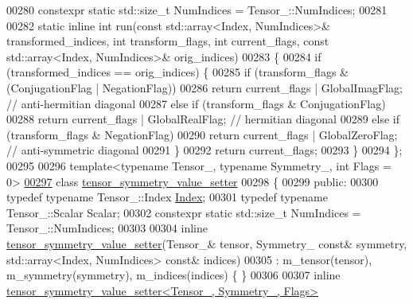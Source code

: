 \begin{DoxyCode}
00280   constexpr \textcolor{keyword}{static} std::size\_t NumIndices = Tensor\_::NumIndices;
00281 
00282   \textcolor{keyword}{static} \textcolor{keyword}{inline} \textcolor{keywordtype}{int} run(\textcolor{keyword}{const} std::array<Index, NumIndices>& transformed\_indices, \textcolor{keywordtype}{int} transform\_flags, \textcolor{keywordtype}{int} 
      current\_flags, \textcolor{keyword}{const} std::array<Index, NumIndices>& orig\_indices)
00283   \{
00284     \textcolor{keywordflow}{if} (transformed\_indices == orig\_indices) \{
00285       \textcolor{keywordflow}{if} (transform\_flags & (ConjugationFlag | NegationFlag))
00286         \textcolor{keywordflow}{return} current\_flags | GlobalImagFlag; \textcolor{comment}{// anti-hermitian diagonal}
00287       \textcolor{keywordflow}{else} \textcolor{keywordflow}{if} (transform\_flags & ConjugationFlag)
00288         \textcolor{keywordflow}{return} current\_flags | GlobalRealFlag; \textcolor{comment}{// hermitian diagonal}
00289       \textcolor{keywordflow}{else} \textcolor{keywordflow}{if} (transform\_flags & NegationFlag)
00290         \textcolor{keywordflow}{return} current\_flags | GlobalZeroFlag; \textcolor{comment}{// anti-symmetric diagonal}
00291     \}
00292     \textcolor{keywordflow}{return} current\_flags;
00293   \}
00294 \};
00295 
00296 \textcolor{keyword}{template}<\textcolor{keyword}{typename} Tensor\_, \textcolor{keyword}{typename} Symmetry\_, \textcolor{keywordtype}{int} Flags = 0>
\hyperlink{class_eigen_1_1internal_1_1tensor__symmetry__value__setter}{00297} \textcolor{keyword}{class }\hyperlink{class_eigen_1_1internal_1_1tensor__symmetry__value__setter}{tensor\_symmetry\_value\_setter}
00298 \{
00299   \textcolor{keyword}{public}:
00300     \textcolor{keyword}{typedef} \textcolor{keyword}{typename} Tensor\_::Index \hyperlink{namespace_eigen_a62e77e0933482dafde8fe197d9a2cfde}{Index};
00301     \textcolor{keyword}{typedef} \textcolor{keyword}{typename} Tensor\_::Scalar Scalar;
00302     constexpr \textcolor{keyword}{static} std::size\_t NumIndices = Tensor\_::NumIndices;
00303 
00304     \textcolor{keyword}{inline} \hyperlink{class_eigen_1_1internal_1_1tensor__symmetry__value__setter}{tensor\_symmetry\_value\_setter}(Tensor\_& tensor, Symmetry\_ \textcolor{keyword}{const}& 
      symmetry, std::array<Index, NumIndices> \textcolor{keyword}{const}& indices)
00305       : m\_tensor(tensor), m\_symmetry(symmetry), m\_indices(indices) \{ \}
00306 
00307     \textcolor{keyword}{inline} \hyperlink{class_eigen_1_1internal_1_1tensor__symmetry__value__setter}{tensor\_symmetry\_value\_setter<Tensor\_, Symmetry\_, Flags>}

\end{DoxyCode}
